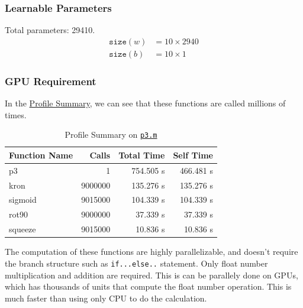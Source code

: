 \subsubsection{Learnable Parameters}
Total parameters: 29410.
\begin{align*}
    \texttt{size}(w)&=10\times2940\\
    \texttt{size}(b)&=10\times1
\end{align*}

\subsubsection{GPU Requirement}
In the \hyperref[profile]{Profile Summary}, we can see that these functions are called millions of times.
\begin{table}
    \centering
    \begin{tabular}{l|r|r|r}
        Function Name & Calls & Total Time & Self Time\\ \hline
        p3 & 1 & 754.505 s & 466.481 s\\
        kron & 9000000 &135.276 s & 135.276 s\\
        sigmoid & 9015000 & 104.339 s & 104.339 s\\
        rot90 & 9000000 & 37.339 s & 37.339 s\\
        squeeze & 9015000 & 10.836 s & 10.836 s\\
    \end{tabular}
    \label{profile}
    \caption{Profile Summary on \href{./hw6/p3.m}{\texttt{p3.m}}}
\end{table}
The computation of these functions are highly parallelizable, and doesn't require the branch structure such as \texttt{if...else..} statement.
Only float number multiplication and addition are required.
This is can be parallely done on GPUs, which has thousands of units that compute the float number operation.
This is much faster than using only CPU to do the calculation.
